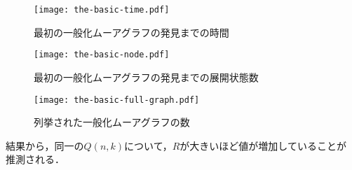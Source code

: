 \begin{figure}
  \centering
  \texttt{[image: the-basic-time.pdf]}
  \caption{最初の一般化ムーアグラフの発見までの時間}
  \label{fig:basic-time}
\end{figure}
\begin{figure}
  \centering
  \texttt{[image: the-basic-node.pdf]}
  \caption{最初の一般化ムーアグラフの発見までの展開状態数}
  \label{fig:basic-node}
\end{figure}
\begin{figure}
  \centering
  \texttt{[image: the-basic-full-graph.pdf]}
  \caption{列挙された一般化ムーアグラフの数}
  \label{fig:basic-full-graph}
\end{figure}

結果から，同一の$Q(n,k)$について，$R$が大きいほど値が増加していることが
推測される．
